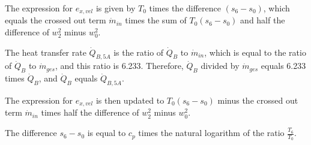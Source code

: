 The expression for \( e_{x,vel} \) is given by \( T_{0} \) times the difference \( (s_{6} - s_{0}) \), which equals the crossed out term \( \dot{m}_{in} \) times the sum of \( T_{0} (s_{6} - s_{0}) \) and half the difference of \( w_{2}^{2} \) minus \( w_{0}^{2} \).

The heat transfer rate \( \dot{Q}_{B,5A} \) is the ratio of \( \dot{Q}_{B} \) to \( \dot{m}_{in} \), which is equal to the ratio of \( \dot{Q}_{B} \) to \( \dot{m}_{ges} \), and this ratio is 6.233. Therefore, \( \dot{Q}_{B} \) divided by \( \dot{m}_{ges} \) equals 6.233 times \( \dot{Q}_{B} \), and \( \dot{Q}_{B} \) equals \( \dot{Q}_{B,5A} \).

The expression for \( e_{x,vel} \) is then updated to \( T_{0} (s_{6} - s_{0}) \) minus the crossed out term \( \dot{m}_{in} \) times half the difference of \( w_{2}^{2} \) minus \( w_{0}^{2} \).

The difference \( s_{6} - s_{0} \) is equal to \( c_{p} \) times the natural logarithm of the ratio \( \frac{T_{6}}{T_{0}} \).